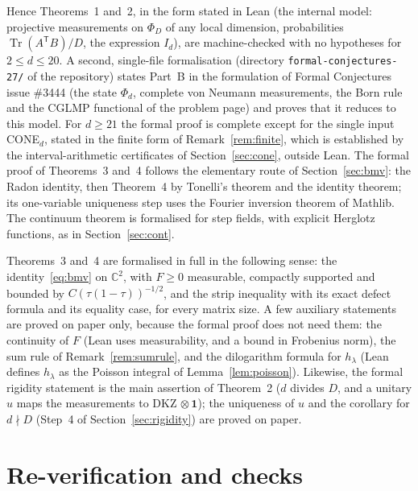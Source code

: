 \documentclass[11pt]{amsart}
\theoremstyle{definition}
\theoremstyle{remark}
\numberwithin{equation}{section}
\newcommand{\C}{\mathbb{C}}
\newcommand{\Tr}{\operatorname{Tr}}
\newcommand{\one}{\mathbf{1}}
\begin{document}
Hence Theorems~1 and~2, in the form stated in Lean (the internal model: projective measurements on $\Phi_D$ of any
local dimension, probabilities $\Tr(A^{\mathsf T}B)/D$, the expression $I_d$), are machine-checked with no hypotheses
for $2\le d\le20$. A second, single-file formalisation (directory \texttt{formal-conjectures-27/} of the
repository\cite{repoOQP}) states Part~B in the formulation of Formal Conjectures issue \#3444 (the state $\Phi_d$,
complete von Neumann measurements, the Born rule and the CGLMP functional of the problem page) and proves that it
reduces to this model. For $d\ge21$ the formal proof is complete except for the single input CONE$_d$, stated in the finite form of
Remark~\ref{rem:finite}, which is established by the interval-arithmetic certificates of Section~\ref{sec:cone},
outside Lean. The formal proof of Theorems~3 and~4 follows the elementary route of Section~\ref{sec:bmv}: the Radon
identity, then Theorem~4 by Tonelli's theorem and the identity theorem; its one-variable uniqueness step uses the
Fourier inversion theorem of Mathlib. The continuum theorem is formalised for step fields, with explicit Herglotz
functions, as in Section~\ref{sec:cont}.

Theorems~3 and~4 are formalised in full in the following sense: the identity~\eqref{eq:bmv} on $\C^2$, with $F\ge0$
measurable, compactly supported and bounded by $C(\tau(1-\tau))^{-1/2}$, and the strip inequality with its exact defect
formula and its equality case, for every matrix size. A few auxiliary statements are proved on paper only, because the
formal proof does not need them: the continuity of $F$ (Lean uses measurability, and a bound in Frobenius norm), the sum
rule of Remark~\ref{rem:sumrule}, and the dilogarithm formula for $h_\lambda$ (Lean defines $h_\lambda$ as the Poisson integral
of Lemma~\ref{lem:poisson}). Likewise, the formal rigidity statement is the main assertion of Theorem~2 ($d$ divides $D$,
and a unitary $u$ maps the measurements to DKZ$\,\otimes\one$); the uniqueness of $u$ and the corollary for $d\nmid D$
(Step~4 of Section~\ref{sec:rigidity}) are proved on paper.

\section{Re-verification and checks}\label{sec:checks}
\end{document}
